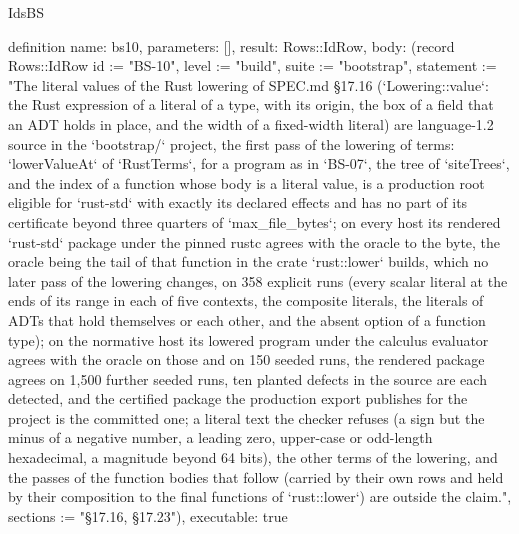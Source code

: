 \begin{lexlean}{IdsBS}
\begin{semanticmodule}
definition{
  name: bs10,
  parameters: [],
  result: Rows::IdRow,
  body: (record Rows::IdRow {id := "BS-10", level := "build", suite := "bootstrap", statement := "The literal values of the Rust lowering of SPEC.md §17.16 (`Lowering::value`: the Rust expression of a literal of a type, with its origin, the box of a field that an ADT holds in place, and the width of a fixed-width literal) are language-1.2 source in the `bootstrap/` project, the first pass of the lowering of terms: `lowerValueAt` of `RustTerms`, for a program as in `BS-07`, the tree of `siteTrees`, and the index of a function whose body is a literal value, is a production root eligible for `rust-std` with exactly its declared effects and has no part of its certificate beyond three quarters of `max_file_bytes`; on every host its rendered `rust-std` package under the pinned rustc agrees with the oracle to the byte, the oracle being the tail of that function in the crate `rust::lower` builds, which no later pass of the lowering changes, on 358 explicit runs (every scalar literal at the ends of its range in each of five contexts, the composite literals, the literals of ADTs that hold themselves or each other, and the absent option of a function type); on the normative host its lowered program under the calculus evaluator agrees with the oracle on those and on 150 seeded runs, the rendered package agrees on 1,500 further seeded runs, ten planted defects in the source are each detected, and the certified package the production export publishes for the project is the committed one; a literal text the checker refuses (a sign but the minus of a negative number, a leading zero, upper-case or odd-length hexadecimal, a magnitude beyond 64 bits), the other terms of the lowering, and the passes of the function bodies that follow (carried by their own rows and held by their composition to the final functions of `rust::lower`) are outside the claim.", sections := "§17.16, §17.23"}),
  executable: true
}


\end{semanticmodule}
\end{lexlean}
